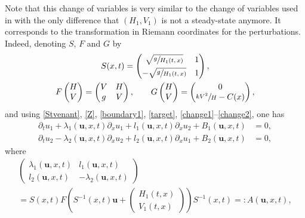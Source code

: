 \documentclass[JEP,XML,SOM,Unicode]{cedram}
\theoremstyle{definition}
\begin{document}
Note that this change of variables is very similar to the change of variables used in \hbox{\cite{BastinCoron22,HS}} with the only difference that $(H_{1},V_{1})$ is not a steady-state anymore.
It corresponds to the transformation in Riemann coordinates for the perturbations.
Indeed, denoting $S$, $F$ and $G$ by
\begin{gather}
S(x,t)=\begin{pmatrix}\sqrt{\sfrac{g}{H_{1}(t,x)}} & 1\\[3pt]
-\sqrt{\sfrac{g}{H_{1}(t,x)}} & 1\end{pmatrix},
\label{defS}\\
F\begin{pmatrix}H\\V\end{pmatrix}=\begin{pmatrix}
V & H\\
g & V
\end{pmatrix},
\label{defF}\qquad
G\begin{pmatrix}H\\V\end{pmatrix}=\begin{pmatrix}0\\\sfrac{kV^{2}}{H}-C(x)\end{pmatrix},
\end{gather}
and using \eqref{Stvenant}, \eqref{Z}, \eqref{boundary1}, \eqref{target}, \eqref{change1}--\eqref{change2}, one has
\begin{equation}
\label{sys1}
\begin{split}
\partial_{t}u_{1}+\lambda_{1}(\boldsymbol{u},x,t)\partial_{x}u_{1}+l_{1}(\boldsymbol{u},x,t)\partial_{x}u_{2}+B_{1}(\boldsymbol{u},x,t)&=0,\\
\partial_{t}{u_{2}}-\lambda_{2}(\boldsymbol{u},x,t)\partial_{x}u_{2}+l_{2}(\boldsymbol{u},x,t)\partial_{x}u_{1}+B_{2}(\boldsymbol{u},x,t)&=0,
\end{split}
\end{equation}
where\vspace*{-5pt}
\begin{multline}
\label{defA}
\begin{pmatrix}\lambda_{1}(\boldsymbol{u},x,t) & l_{1}(\boldsymbol{u},x,t)\\l_{2}(\boldsymbol{u},x,t) & -\lambda_{2}(\boldsymbol{u},x,t)\end{pmatrix}\\[-5pt]
=S(x,t)F\left(S^{-1}(x,t)\boldsymbol{u}+\begin{pmatrix}H_{1}(t,x)\\V_{1}(t,x)\end{pmatrix}\right)S^{-1}(x,t)=:A(\boldsymbol{u},x,t),
\end{multline}
\end{document}

